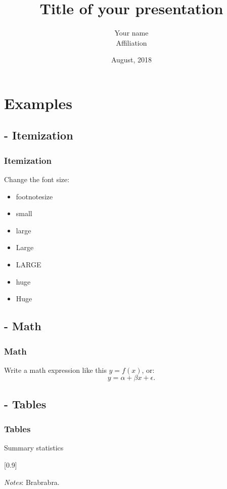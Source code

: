 \documentclass[10pt]{beamer}
\title{Title of your presentation}
\author{Your name \\ Affiliation}
\date{August, 2018}
\begin{document}
\maketitle


\section{Examples}


\subsection{- Itemization}

\begin{frame}
  \frametitle{Itemization}

Change the font size:
\begin{itemize}
	\item {\footnotesize footnotesize}
	\item {\small small}
	\item {\large large}
	\item {\Large Large}
	\item {\LARGE LARGE}
	\item {\huge huge}
	\item {\Huge Huge}
\end{itemize}

\end{frame}

\subsection{- Math}

\begin{frame}
  \frametitle{Math}

Write a math expression like this $y = f(x)$, or:
\begin{equation}
	y = \alpha + \beta x + \epsilon. \label{eq:reg} 
\end{equation}

\end{frame}


\subsection{- Tables}

\begin{frame}
  \frametitle{Tables}

\begin{table}[H] 
	\caption{Summary statistics}
	\begin{center}
	\scalebox{0.9}[0.9]{
		
	}
	\end{center}
\end{table}
{\footnotesize {\it Notes}: Brabrabra.}

\end{frame}
\end{document}
